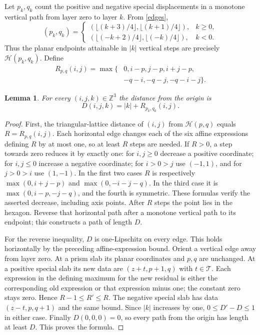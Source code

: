 \documentclass[11pt]{article}
\newtheorem{lemma}[theorem]{Lemma}
\newcommand{\Z}{\mathbb Z}
\newcommand{\T}{\mathcal T}
\newcommand{\Hh}{\mathcal H}
\begin{document}
Let $p_k,q_k$ count the positive and negative special displacements in a
monotone vertical path from layer zero to layer $k$. From \eqref{edges},
\begin{equation}\label{slabs}
(p_k,q_k)=
\begin{cases}
(\lfloor(k+3)/4\rfloor,\lfloor(k+1)/4\rfloor),&k\ge0,\\
(\lfloor(-k+2)/4\rfloor,\lfloor(-k)/4\rfloor),&k<0.
\end{cases}
\end{equation}
Thus the planar endpoints attainable in $|k|$ vertical steps are precisely
$\Hh(p_k,q_k)$. Define
\begin{align*}
R_{p,q}(i,j)=\max\{&0,i-p,j-p,i+j-p,\\
                  &-q-i,-q-j,-q-i-j\}.
\end{align*}
\begin{lemma}\label{metric}
For every $(i,j,k)\in\Z^3$ the distance from the origin is
\[
D(i,j,k)=|k|+R_{p_k,q_k}(i,j).
\]
\end{lemma}
\begin{proof}
First, the triangular-lattice distance of $(i,j)$ from $\Hh(p,q)$ equals
$R=R_{p,q}(i,j)$. Each horizontal edge changes each of the six affine
expressions defining $R$ by at most one, so at least $R$ steps are needed.
If $R>0$, a step towards zero reduces it by exactly one: for $i,j\ge0$
decrease a positive coordinate; for $i,j\le0$ increase a negative
coordinate; for $i>0>j$ use $(-1,1)$, and for $j>0>i$ use $(1,-1)$.
In the first two cases $R$ is respectively
$\max(0,i+j-p)$ and $\max(0,-i-j-q)$.
In the third case it is $\max(0,i-p,-j-q)$, and the fourth is symmetric.
These formulas verify the asserted decrease, including axis points.
After $R$ steps the point lies in the hexagon.
Reverse that horizontal path after a monotone vertical path to its endpoint;
this constructs a path of length $D$.

For the reverse inequality, $D$ is one-Lipschitz on every edge.
This holds horizontally by the preceding affine-expression bound.
Orient a vertical edge away from layer zero. At a prism slab its planar
coordinates and $p,q$ are unchanged. At a positive special slab its new
data are $(z+t,p+1,q)$ with $t\in\T$.
Each expression in the defining maximum for the new residual is either
the corresponding old expression or that expression minus one;
the constant zero stays zero. Hence $R-1\le R'\le R$.
The negative special slab has data $(z-t,p,q+1)$ and the same bound.
Since $|k|$ increases by one, $0\le D'-D\le1$ in either case.
Finally $D(0,0,0)=0$, so every path from the origin has length at least
$D$. This proves the formula.
\end{proof}
\end{document}
